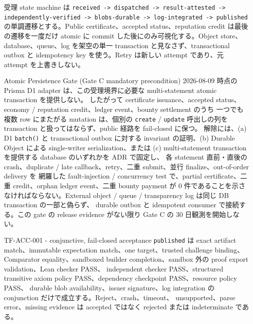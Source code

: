 \documentclass[a4paper,11pt]{ltjsarticle}
\newcommand{\code}[1]{\texttt{#1}}
\begin{document}
受理 state machine は
\code{received -> dispatched -> result-attested -> independently-verified -> blobs-durable -> log-integrated -> published}
の単調遷移とする。Public certificate、accepted status、reputation credit は最後の遷移を一度だけ atomic に commit
した後にのみ可視化する。Object store、database、queue、log を架空の単一 transaction と見なさず、transactional
outbox と idempotency key を使う。Retry は新しい attempt であり、元 attempt を上書きしない。

\clearpage
\begin{atomicgatebox}{Atomic Persistence Gate (Gate C mandatory precondition)}
2026-08-09 時点の Prisma D1 adapter は、この受理境界に必要な multi-statement atomic transaction を提供しない。
したがって certificate issuance、accepted status、economy / reputation credit、ledger event、bounty settlement のうち
一つでも複数 row にまたがる mutation は、個別の
\code{create} / \code{update} 呼出しの列を transaction と扱ってはならず、public 経路を fail-closed に保つ。
解除には、(a) D1 \code{batch()} と transactional outbox に対する invariant の証明、(b) Durable Object による
single-writer serialization、または (c) multi-statement transaction を提供する database のいずれかを ADR で固定し、
各 statement 直前・直後の crash、duplicate / late callback、retry、二重 submit、並行 finalize、out-of-order delivery を
網羅した fault-injection / concurrency test で、partial certificate、二重 credit、orphan ledger event、二重 bounty payment が
0 件であることを示さなければならない。External object / queue / transparency log は同じ DB transaction の一部と偽らず、
durable outbox と idempotent consumer で接続する。この gate の release evidence がない限り Gate C の 30 日観測を開始しない。
\end{atomicgatebox}

\begin{principlebox}{TF-ACC-001 - conjunctive, fail-closed acceptance}
\code{published} は exact artifact match、immutable expectation match、one target、trusted challenge binding、
Comparator equality、sandboxed builder completion、sandbox 外の proof export validation、Lean checker PASS、
independent checker PASS、structured transitive axiom policy PASS、dependency checkpoint PASS、resource policy PASS、
durable blob availability、issuer signature、log integration の conjunction だけで成立する。Reject、crash、timeout、
unsupported、parse error、missing evidence は accepted ではなく rejected または indeterminate である。
\end{principlebox}
\end{document}
